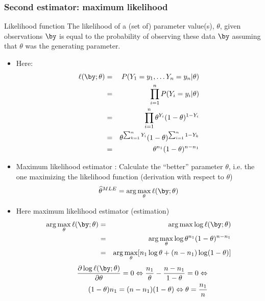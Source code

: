 \begin{frame}[allowframebreaks]\frametitle{Second estimator: maximum likelihood}
% 
\begin{block}{Likelihood function}
  The likelihood of a (set of) parameter value(s), $\theta$, given observations $\by$  is equal to the probability of observing these data $\by$ assuming that $\theta$ was the generating parameter.   
  \end{block}
  \label{computlikbern}
  \begin{itemize}
  \item \vert Here: \noir 
  \begin{eqnarray*}
  \ell(\by; \theta)   &=&P(Y_1=y_1, \dots Y_n = y_n | \theta) \\
  &=& \prod_{i=1}^n P(Y_i=y_i | \theta)\\
  &=& \prod_{i=1}^n \theta^{Y_{i}} (1-\theta)^{1-Y_{i}} \\
  &=& \theta^{\sum_{k=1}^n Y_{i}} (1-\theta)^{\sum_{i=1}^n 1-Y_{k}}\\
  &=& \theta^{n_1} (1-\theta)^{n-n_1}\\
  \end{eqnarray*}
 \item \vert Maximum likelihood estimator \noir  : Calculate  the ``better'' parameter $\theta$, i.e. the one maximizing the likelihood function (derivation with respect to $\theta$) 
  $$ \widehat{\theta}^{MLE}= \arg\max_{\theta}\ell(\by; \theta) $$
 \item  \vert Here \noir  maximum likelihood estimator (estimation) 
 \begin{eqnarray*} 
  \arg\max_{\theta}\ell(\by; \theta) &=& \arg\max \log \ell(\by; \theta)\\
  &=& \arg\max_{\theta} \log  \theta^{n_1} (1-\theta)^{n-n_1}\\
  &=&  \arg\max_{\theta}[ n_1  \log \theta + (n-n_1)\log (1-\theta)]
  \end{eqnarray*}
% 
\begin{eqnarray*}
 &&\frac{\partial  \log \ell(\by; \theta)}{\partial \theta}= 0  
  \Leftrightarrow  \frac{n_1}{\theta} -  \frac{n- n_1}{1-\theta} = 0 \Leftrightarrow \\
 && (1-\theta) n_1 = (n-n_1)(1-\theta) \Leftrightarrow \theta = \frac{n_1}{n}

\end{eqnarray*}
\end{itemize}
\end{frame}
